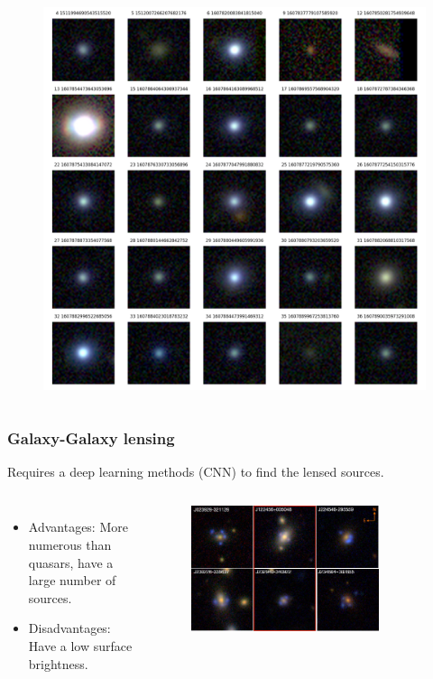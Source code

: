 \documentclass{beamer}
\begin{document}
\begin{frame}
\begin{columns}
        \begin{figure}
            \centering
            \includegraphics[width=1.0\textwidth]{../../figs/gaia_quasars.png}
        \end{figure}
    \end{columns}
\end{frame}


\begin{frame}
\frametitle{Galaxy-Galaxy lensing}
    Requires a deep learning methods (CNN) to find the lensed sources.
    \begin{columns}
        \begin{itemize}
            \item Advantages: More numerous than quasars, have a large number of sources.
            \item Disadvantages: Have a low surface brightness. 
        \end{itemize}
        \begin{figure}
            \centering
            \includegraphics[width=0.8\textwidth]{../../figs/apjad684cf1_lr.jpg}
        \end{figure}
    \end{columns}
        
\end{frame}
\end{document}
